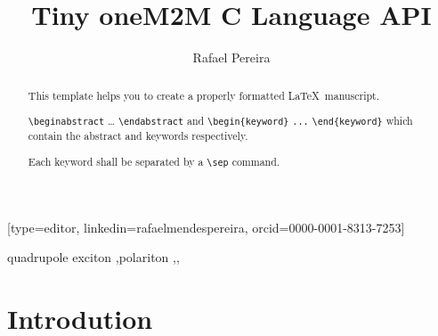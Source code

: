 \documentclass[a4paper,fleqn]{cas-dc}
\begin{document}
\let\WriteBookmarks\relax
\def\floatpagepagefraction{1}
\def\textpagefraction{.001}

\title [mode = title]{Tiny oneM2M C Language API}                     


\author[1]{Rafael Pereira}[type=editor,
                        linkedin=rafaelmendespereira,
                        orcid=0000-0001-8313-7253]
   
\address[1]{Computer Science and Communications Research Centre, School of Technology and Management, Polytechnic of Leiria, 2411-901 Leiria, Portugal}

\begin{abstract}
This template helps you to create a properly formatted \LaTeX\ manuscript.

\noindent\texttt{\textbackslash begin{abstract}} \dots 
\texttt{\textbackslash end{abstract}} and
\verb+\begin{keyword}+ \verb+...+ \verb+\end{keyword}+ 
which
contain the abstract and keywords respectively. 

\noindent Each keyword shall be separated by a \verb+\sep+ command.
\end{abstract}

%

\begin{keywords}
quadrupole exciton \sep polariton \sep \WGM \sep \BEC
\end{keywords}


\maketitle

\section{Introdution}
\end{document}
